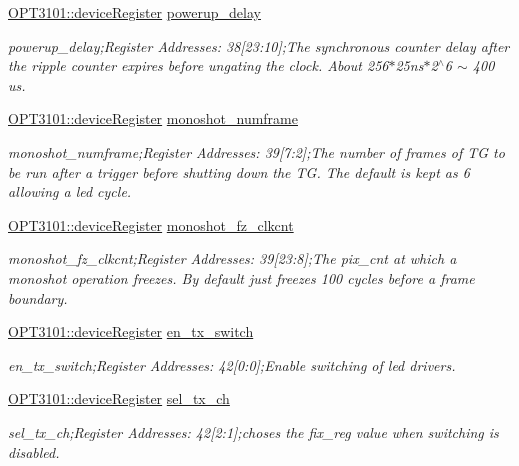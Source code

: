 \begin{DoxyCompactItemize}
\mbox{\hyperlink{class_o_p_t3101_1_1device_register}{O\+P\+T3101\+::device\+Register}} \mbox{\hyperlink{class_o_p_t3101_1_1registers_ad70826caf46b032bda2867212f4d2195}{powerup\+\_\+delay}}
\begin{DoxyCompactList}\small\item\em powerup\+\_\+delay;Register Addresses\+: 38\mbox{[}23\+:10\mbox{]};The synchronous counter delay after the ripple counter expires before ungating the clock. About 256$\ast$25ns$\ast$2$^\wedge$6 $\sim$ 400 us. \end{DoxyCompactList}\item 
\mbox{\hyperlink{class_o_p_t3101_1_1device_register}{O\+P\+T3101\+::device\+Register}} \mbox{\hyperlink{class_o_p_t3101_1_1registers_a88eb0b748ad9049d7c563196e7518f43}{monoshot\+\_\+numframe}}
\begin{DoxyCompactList}\small\item\em monoshot\+\_\+numframe;Register Addresses\+: 39\mbox{[}7\+:2\mbox{]};The number of frames of TG to be run after a trigger before shutting down the TG. The default is kept as 6 allowing a led cycle. \end{DoxyCompactList}\item 
\mbox{\hyperlink{class_o_p_t3101_1_1device_register}{O\+P\+T3101\+::device\+Register}} \mbox{\hyperlink{class_o_p_t3101_1_1registers_a7e608b657646a90dd8dfdc3dff0047fb}{monoshot\+\_\+fz\+\_\+clkcnt}}
\begin{DoxyCompactList}\small\item\em monoshot\+\_\+fz\+\_\+clkcnt;Register Addresses\+: 39\mbox{[}23\+:8\mbox{]};The pix\+\_\+cnt at which a monoshot operation freezes. By default just freezes 100 cycles before a frame boundary. \end{DoxyCompactList}\item 
\mbox{\hyperlink{class_o_p_t3101_1_1device_register}{O\+P\+T3101\+::device\+Register}} \mbox{\hyperlink{class_o_p_t3101_1_1registers_a6186d62592ab031ce3a996942b739ab7}{en\+\_\+tx\+\_\+switch}}
\begin{DoxyCompactList}\small\item\em en\+\_\+tx\+\_\+switch;Register Addresses\+: 42\mbox{[}0\+:0\mbox{]};Enable switching of led drivers. \end{DoxyCompactList}\item 
\mbox{\hyperlink{class_o_p_t3101_1_1device_register}{O\+P\+T3101\+::device\+Register}} \mbox{\hyperlink{class_o_p_t3101_1_1registers_af79e0b3cfd511e7aa03cf3e55774f0d0}{sel\+\_\+tx\+\_\+ch}}
\begin{DoxyCompactList}\small\item\em sel\+\_\+tx\+\_\+ch;Register Addresses\+: 42\mbox{[}2\+:1\mbox{]};choses the fix\+\_\+reg value when switching is disabled. \end{DoxyCompactList}\item 

\end{DoxyCompactItemize}
